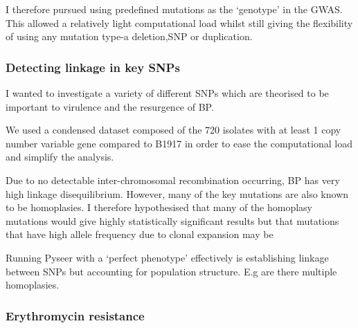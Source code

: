 \documentclass{article}
\begin{document}
 




I therefore pursued using predefined mutations as the `genotype' in the GWAS. This allowed a relatively light computational load whilst still giving the flexibility of using any mutation type-a deletion,SNP or duplication.

\subsubsection{Detecting linkage in key SNPs}


I wanted to investigate a variety of different SNPs which are theorised to be important to virulence and the resurgence of BP.

We used a condensed dataset composed of the 720 isolates with at least 1 copy number variable gene compared to B1917 in order to ease the computational load and simplify the analysis.

Due to no detectable inter-chromosomal recombination occurring, BP has very high linkage disequilibrium. However, many of the key mutations are also known to be homoplasies. I therefore hypothesised that many of the homoplasy mutations would give highly statistically significant results but that mutations that have high allele frequency due to clonal expansion may be 

Running Pyseer with a `perfect phenotype' effectively is establishing linkage between SNPs but accounting for population structure. E.g are there multiple homoplasies.


\subsubsection{Erythromycin resistance}
\end{document}
